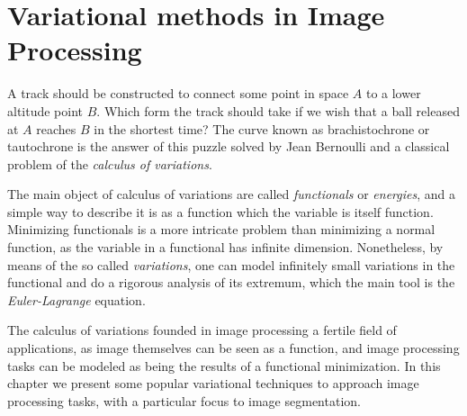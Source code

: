 \chapter{Variational methods in Image Processing}
\label{chapter:variational-methods-in-image-processing}

A track should be constructed to connect some point in space $A$ to a lower altitude point $B$. Which form the track should take if we wish that a ball released at $A$ reaches $B$ in the shortest time? The curve known as brachistochrone or tautochrone is the answer of this puzzle solved by Jean Bernoulli and a classical problem of the \emph{calculus of variations}. 

The main object of calculus of variations are called \emph{functionals} or \emph{energies}, and a simple way to describe it is as a function which the variable is itself function. Minimizing functionals is a more intricate problem than minimizing a normal function, as the variable in a functional has infinite dimension. Nonetheless, by means of the so called \emph{variations}, one can model infinitely small variations in the functional and do a rigorous analysis of its extremum, which the main tool is the \emph{Euler-Lagrange} equation.

The calculus of variations founded in image processing a fertile field of applications, as image themselves can be seen as a function, and image processing tasks can be modeled as being the results of a functional minimization. In this chapter we present some popular variational techniques to approach image processing tasks, with a particular focus to image segmentation. 


